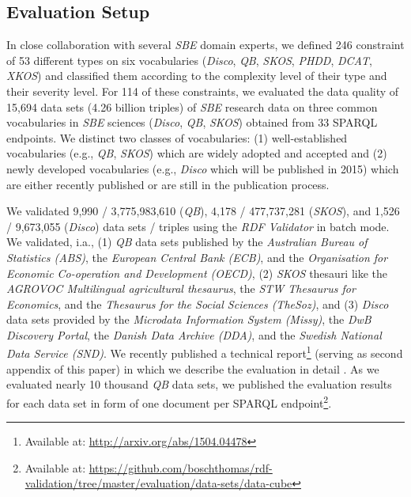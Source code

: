 \documentclass{llncs}
\newcommand{\ke}[1]{\todo[size=\small, color=red!40]{\textbf{Kai:} #1}}
\begin{document}
{{\subsection{Evaluation Setup}

In close collaboration with several \emph{SBE} domain experts, we defined 246 constraint 
of 53 different types on six vocabularies (\emph{Disco}, \emph{QB}, \emph{SKOS}, \emph{PHDD}, \emph{DCAT}, \emph{XKOS}) and classified them according to the complexity level of their type and their severity level. 
For 114 of these constraints, we evaluated the data quality of 15,694 data sets (4.26 billion triples) of \emph{SBE} research data on three common vocabularies in \emph{SBE} sciences (\emph{Disco}, \emph{QB}, \emph{SKOS}) obtained from 33 SPARQL endpoints.
We distinct two classes of vocabularies: 
(1) well-established vocabularies (e.g., \emph{QB}, \emph{SKOS}) which are widely adopted and accepted and 
(2) newly developed vocabularies (e.g., \emph{Disco} which will be published in 2015) which are either recently published or are still in the publication process.

We validated 
9,990 / 3,775,983,610 (\emph{QB}),
4,178 / 477,737,281 (\emph{SKOS}), and 
1,526 / 9,673,055 (\emph{Disco}) data sets / triples using the \emph{RDF Validator} in batch mode.
We validated, i.a., 
(1) \emph{QB} data sets published by the \emph{Australian Bureau of Statistics (ABS)},
the \emph{European Central Bank (ECB)}, and the
\emph{Organisation for Economic Co-operation and Development (OECD)},
(2) \emph{SKOS} thesauri like the \emph{AGROVOC Multilingual agricultural thesaurus},
the \emph{STW Thesaurus for Economics}, and the
\emph{Thesaurus for the Social Sciences (TheSoz)}, and
(3) \emph{Disco} data sets provided by the \emph{Microdata Information System (Missy)}, 
the \emph{DwB Discovery Portal}, the
\emph{Danish Data Archive (DDA)}, and the
\emph{Swedish National Data Service (SND)}.
We recently published a technical report\footnote{\label{technical-report-2}Available at: \url{http://arxiv.org/abs/1504.04478}} (serving as second appendix of this paper) 
in which we describe the evaluation in detail \cite{BoschZapilkoWackerowEckert2015-2}. 
As we evaluated nearly 10 thousand \emph{QB} data sets, we published the evaluation results for each data set in form of one document per SPARQL endpoint\footnote{Available at: \url{https://github.com/boschthomas/rdf-validation/tree/master/evaluation/data-sets/data-cube}}.

}}
\end{document}

